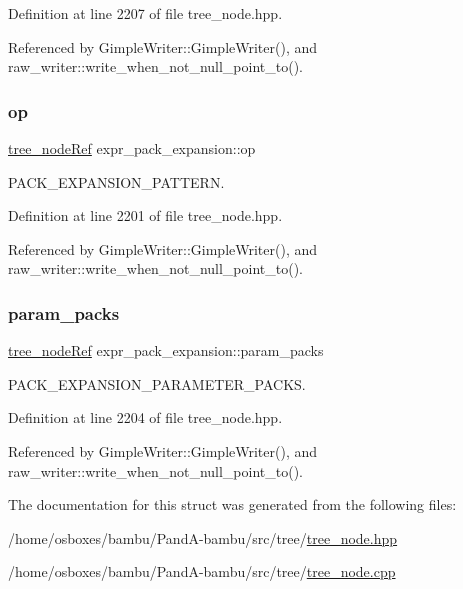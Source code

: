 Definition at line 2207 of file tree\+\_\+node.\+hpp.



Referenced by Gimple\+Writer\+::\+Gimple\+Writer(), and raw\+\_\+writer\+::write\+\_\+when\+\_\+not\+\_\+null\+\_\+point\+\_\+to().

\mbox{\label{structexpr__pack__expansion_ae8b4fd836f68167feda8e4b2398989cf}} 
\subsubsection{\texorpdfstring{op}{op}}
{\footnotesize\ttfamily \hyperlink{tree__node_8hpp_a6ee377554d1c4871ad66a337eaa67fd5}{tree\+\_\+node\+Ref} expr\+\_\+pack\+\_\+expansion\+::op}



P\+A\+C\+K\+\_\+\+E\+X\+P\+A\+N\+S\+I\+O\+N\+\_\+\+P\+A\+T\+T\+E\+RN. 



Definition at line 2201 of file tree\+\_\+node.\+hpp.



Referenced by Gimple\+Writer\+::\+Gimple\+Writer(), and raw\+\_\+writer\+::write\+\_\+when\+\_\+not\+\_\+null\+\_\+point\+\_\+to().

\mbox{\label{structexpr__pack__expansion_a0a204ae2e8f72e9c3c7396df81433f9f}} 
\subsubsection{\texorpdfstring{param\+\_\+packs}{param\_packs}}
{\footnotesize\ttfamily \hyperlink{tree__node_8hpp_a6ee377554d1c4871ad66a337eaa67fd5}{tree\+\_\+node\+Ref} expr\+\_\+pack\+\_\+expansion\+::param\+\_\+packs}



P\+A\+C\+K\+\_\+\+E\+X\+P\+A\+N\+S\+I\+O\+N\+\_\+\+P\+A\+R\+A\+M\+E\+T\+E\+R\+\_\+\+P\+A\+C\+KS. 



Definition at line 2204 of file tree\+\_\+node.\+hpp.



Referenced by Gimple\+Writer\+::\+Gimple\+Writer(), and raw\+\_\+writer\+::write\+\_\+when\+\_\+not\+\_\+null\+\_\+point\+\_\+to().



The documentation for this struct was generated from the following files\+:\begin{DoxyCompactItemize}
\item 
/home/osboxes/bambu/\+Pand\+A-\/bambu/src/tree/\hyperlink{tree__node_8hpp}{tree\+\_\+node.\+hpp}\item 
/home/osboxes/bambu/\+Pand\+A-\/bambu/src/tree/\hyperlink{tree__node_8cpp}{tree\+\_\+node.\+cpp}\end{DoxyCompactItemize}
